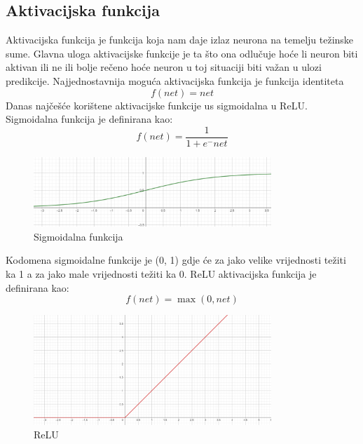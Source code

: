 \subsection{Aktivacijska funkcija}
Aktivacijska funkcija je funkcija koja nam daje izlaz neurona na temelju težinske sume.
Glavna uloga aktivacijske funkcije je ta što ona odlučuje hoće li neuron biti aktivan ili ne ili bolje rečeno hoće neuron u toj situaciji biti
važan u ulozi predikcije.
Najjednostavnija moguća aktivacijska funkcija je funkcija identiteta
\[ f(\textit{net}) = net \]
Danas najčešće korištene aktivacijske funkcije us sigmoidalna u ReLU.
Sigmoidalna funkcija je definirana kao:
\[ f(\textit{net}) = \frac{1}{1 + e^-net} \]
\begin{figure}[H]
    \centering
    \includegraphics[width=0.8\textwidth]{images/Sigmoid}
    \caption{Sigmoidalna funkcija}
    \label{fig:slika2}
\end{figure}
Kodomena sigmoidalne funkcije je (0, 1) gdje će za jako velike vrijednosti težiti ka 1 a za jako male vrijednosti težiti ka 0.
ReLU aktivacijska funkcija je definirana kao:
\[ f(\textit{net}) = \max(0, \textit{net}) \]
\begin{figure}[H]
    \centering
    \includegraphics[width=0.8\textwidth]{images/ReLU}
    \caption{ReLU}
    \label{fig:slika3}
\end{figure}

